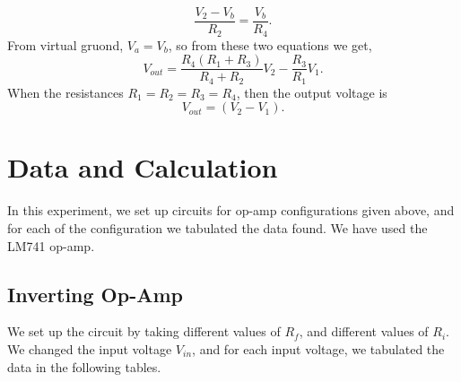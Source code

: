 \documentclass[12pt]{article}
\begin{document}
\begin{equation*}
	\frac{V_2 - V_b}{R_2} = \frac{V_b}{R_4}.
\end{equation*}
From virtual gruond, $ V_a = V_b $, so from these two equations we get, 
\begin{equation*}
	V_{out} = \frac{R_4(R_1 + R_3)}{R_4 + R_2}V_2 - \frac{R_3}{R_1}V_1.
\end{equation*} 
When the resistances $ R_1 = R_2 = R_3 = R_4 $, then the output voltage is 
\begin{equation*}
	V_{out} = (V_2 - V_1).
\end{equation*}
\section{Data and Calculation}
In this experiment, we set up circuits for op-amp configurations given above, and for each of the configuration we tabulated the data found. We have used the LM741 op-amp.
\subsection{Inverting Op-Amp}
We set up the circuit by taking different values of $ R_f $, and different values of $ R_i $.
 We changed the input voltage $ V_{in} $, and for each input voltage, we tabulated the data in the following tables.  
\end{document}
